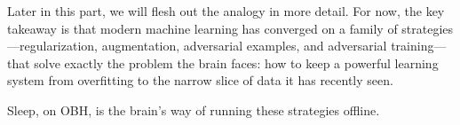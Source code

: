 Later in this part, we will flesh out the analogy in more detail. For now, the key takeaway is that modern machine learning has converged on a family of strategies---regularization, augmentation, adversarial examples, and adversarial training---that solve exactly the problem the brain faces: how to keep a powerful learning system from overfitting to the narrow slice of data it has recently seen.

Sleep, on OBH, is the brain's way of running these strategies offline.
